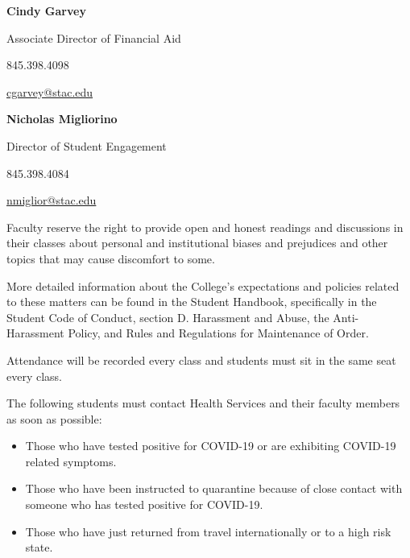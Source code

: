 \documentclass[11pt,letterpaper]{article}
\begin{document}
        \hfill\begin{minipage}[t]{0.45\textwidth}
        {\bfseries Cindy Garvey} \par
        Associate Director of Financial Aid \par
        845.398.4098 \par
        \href{mailto:cgarvey@stac.edu}{cgarvey@stac.edu}
        \end{minipage}\begin{minipage}[t]{0.45\textwidth}
        {\bfseries Nicholas Migliorino} \par
        Director of Student Engagement \par
        845.398.4084 \par
        \href{mailto:nmiglior@stac.edu}{nmiglior@stac.edu}
        \end{minipage} \pspace

Faculty reserve the right to provide open and honest readings and discussions in their classes about personal and institutional biases and prejudices and other topics that may cause discomfort to some. \pspace

More detailed information about the College's expectations and policies related to these matters can be found in the Student Handbook, specifically in the Student Code of Conduct, section D. Harassment and Abuse, the Anti-Harassment Policy, and Rules and Regulations for Maintenance of Order.
\sectionbreak




Attendance will be recorded every class and students must sit in the same seat every class. \pspace

The following students must contact Health Services and their faculty members as soon as possible: 

\begin{itemize}
\item Those who have tested positive for COVID-19 or are exhibiting COVID-19 related symptoms. 

\item Those who have been instructed to quarantine because of close contact with someone who has tested positive for COVID-19.

\item Those who have just returned from travel internationally or to a high risk state.
\end{itemize}
\end{document}
